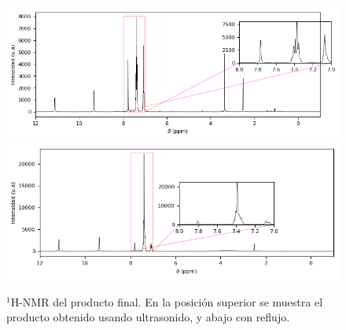 \documentclass[fleqn,10pt]{SelfArx}
\begin{document}
\begin{figure}[h]
	\centering
	\includegraphics[width=\linewidth]{data/H-Dilatin_So}
	\includegraphics[width=\linewidth]{data/H-Dilatin}
	\caption{$^1$H-NMR del producto final. En la posici\'on superior se muestra el producto obtenido usando ultrasonido, y abajo con reflujo.}
	\label{fig: HNMR-Dilantin}
\end{figure}
\end{document}
